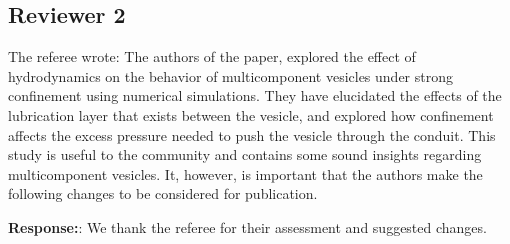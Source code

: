 \documentclass[11pt]{article}
\begin{document}
\newpage 
\subsection*{Reviewer 2}

The referee wrote: The authors of the paper, explored the effect of
hydrodynamics on the behavior of multicomponent vesicles under strong
confinement using numerical simulations. They have elucidated the
effects of the lubrication layer that exists between the vesicle, and
explored how confinement affects the excess pressure needed to push the
vesicle through the conduit. This study is useful to the community and
contains some sound insights regarding multicomponent vesicles. It,
however, is important that the authors make the following changes to be
considered for publication.

\noindent
{\bf Response:}: We thank the referee for their assessment and suggested
changes.
\end{document}
